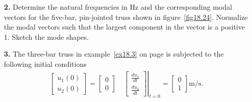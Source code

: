 \documentclass{AeroStructure-ERJohnson}
\begin{document}
\begin{exercise}
\begin{enumerate}[\textbf{2.}]
\item[\textbf{2.}] Determine the natural frequencies in Hz and the corresponding modal vectors for the five-bar, pin-jointed truss shown in figure~\ref{fig18.24}. Normalize the modal vectors such that the largest component in the vector is a positive 1. Sketch the mode shapes.\vspace*{-12pt}

    {\def\thefigure{18.24}
}

\vspace*{-1pc}

\item[\textbf{3.}] The three-bar truss in example~\ref{ex18.3} on page \pageref{ex18.3} is subjected to the following initial conditions
\begin{align}\label{eq18.199}
\left[\begin{matrix}u_{1}(0) \\u_{2}(0)\end{matrix}\right]=
\left.\left[\begin{matrix}0 \\0\end{matrix}\right] \quad\left[\begin{matrix}\displaystyle\frac{d u_{1}}{d t} \\[8pt] \displaystyle\frac{d u_{2}}{d t}\end{matrix}\right]\right|_{t=0}=
\left[\begin{matrix}0 \\1\end{matrix}\right] \mathrm{m}/\mathrm{s}.
\end{align}


\end{enumerate}
\end{exercise}
\end{document}
